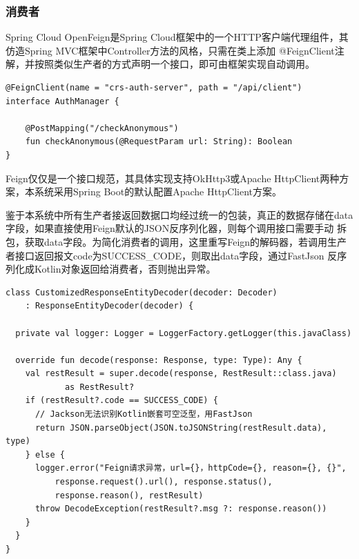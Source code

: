\documentclass[titlepage,UTF8,linespread=1.5]{ctexart}
\begin{document}
\subsubsection{消费者}
Spring Cloud OpenFeign是Spring Cloud框架中的一个HTTP客户端代理组件，其仿造Spring MVC框架中Controller方法的风格，只需在类上添加
@FeignClient注解，并按照类似生产者的方式声明一个接口，即可由框架实现自动调用。\par
\begin{mdframed}\begin{verbatim}
@FeignClient(name = "crs-auth-server", path = "/api/client")
interface AuthManager {

    @PostMapping("/checkAnonymous")
    fun checkAnonymous(@RequestParam url: String): Boolean
}
\end{verbatim}\end{mdframed}\par
Feign仅仅是一个接口规范，其具体实现支持OkHttp3或Apache HttpClient两种方案，本系统采用Spring Boot的默认配置Apache HttpClient方案。\par
鉴于本系统中所有生产者接返回数据口均经过统一的包装，真正的数据存储在data字段，如果直接使用Feign默认的JSON反序列化器，则每个调用接口需要手动
拆包，获取data字段。为简化消费者的调用，这里重写Feign的解码器，若调用生产者接口返回报文code为SUCCESS\_CODE，则取出data字段，通过FastJson
反序列化成Kotlin对象返回给消费者，否则抛出异常。\par
\begin{mdframed}\begin{verbatim}
class CustomizedResponseEntityDecoder(decoder: Decoder)
    : ResponseEntityDecoder(decoder) {

  private val logger: Logger = LoggerFactory.getLogger(this.javaClass)

  override fun decode(response: Response, type: Type): Any {
    val restResult = super.decode(response, RestResult::class.java) 
            as RestResult?
    if (restResult?.code == SUCCESS_CODE) {
      // Jackson无法识别Kotlin嵌套可空泛型，用FastJson
      return JSON.parseObject(JSON.toJSONString(restResult.data), type)
    } else {
      logger.error("Feign请求异常，url={}，httpCode={}, reason={}, {}",
          response.request().url(), response.status(), 
          response.reason(), restResult)
      throw DecodeException(restResult?.msg ?: response.reason())
    }
  }
}
\end{verbatim}\end{mdframed}\par
\end{document}
